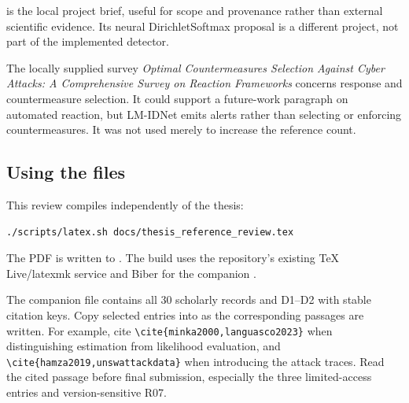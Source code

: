 \documentclass[11pt,a4paper]{article}
\begin{document}
 is
the local project brief, useful for scope and provenance rather than external
scientific evidence. Its neural DirichletSoftmax proposal is a different
project, not part of the implemented detector.

The locally supplied survey \emph{Optimal Countermeasures Selection Against
Cyber Attacks: A Comprehensive Survey on Reaction Frameworks} concerns response
and countermeasure selection. It could support a future-work paragraph on
automated reaction, but LM-IDNet emits alerts rather than selecting or enforcing
countermeasures. It was not used merely to increase the reference count.

\subsection{Using the files}

This review compiles independently of the thesis:
\begin{verbatim}
./scripts/latex.sh docs/thesis_reference_review.tex
\end{verbatim}
The PDF is written to . The build uses
the repository's existing TeX Live/latexmk service and Biber for the companion
.

The companion file contains all 30 scholarly records and D1--D2 with stable
citation keys. Copy selected entries into  as the
corresponding passages are written. For example, cite
\verb|\cite{minka2000,languasco2023}| when distinguishing estimation from
likelihood evaluation, and \verb|\cite{hamza2019,unswattackdata}| when
introducing the attack traces. Read the cited passage before final submission,
especially the three limited-access entries and version-sensitive R07.
\end{document}
